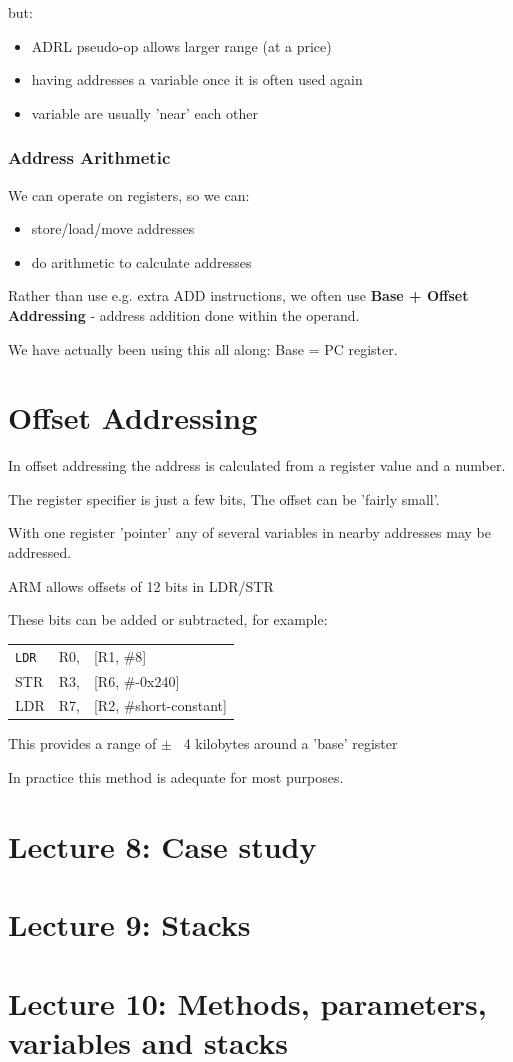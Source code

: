 \documentclass{article}
\begin{document}
but:

\begin{itemize}
  \item ADRL pseudo-op allows larger range (at a price)
  \item having addresses a variable once it is often used again
  \item variable are usually 'near' each other
\end{itemize}

\subsubsection{Address Arithmetic}
We can operate on registers, so we can:

\begin{itemize}
  \item store/load/move addresses
  \item do arithmetic to calculate addresses
\end{itemize}

Rather than use e.g. extra ADD instructions, we often use {\bf Base + Offset Addressing} - address addition done within the operand.

We have actually been using this all along: Base = PC register.

\section{Offset Addressing}
In offset addressing the address is calculated from a register value and a number.

The register specifier is just a few bits, The offset can be 'fairly small'.

With one register 'pointer' any of several variables in nearby addresses may be addressed.

ARM allows offsets of 12 bits in LDR/STR

These bits can be added or subtracted, for example:

\begin{center}
    \begin{tabular}{l l l}
        {\tt LDR} & R0, & [R1, \#8] \\
        STR & R3, & [R6, \#-0x240]\\
        LDR & R7, & [R2, \#short-constant]
    \end{tabular}
\end{center}

This provides a range of $\pm$ ~4 kilobytes around a 'base' register

In practice this method is adequate for most purposes. 

\section{Lecture 8: Case study}
\section{Lecture 9: Stacks}
\section{Lecture 10: Methods, parameters, variables and stacks}
\end{document}
